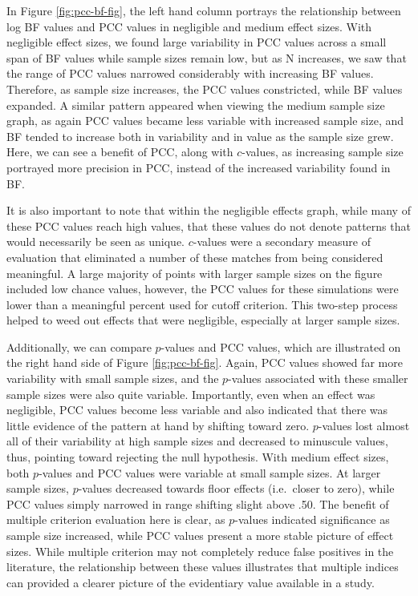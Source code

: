 \documentclass[english,man]{apa6}
\theoremstyle{definition}
\theoremstyle{definition}
\theoremstyle{definition}
\theoremstyle{remark}
\begin{document}
In Figure \ref{fig:pcc-bf-fig}, the left hand column portrays the
relationship between log BF values and PCC values in negligible and
medium effect sizes. With negligible effect sizes, we found large
variability in PCC values across a small span of BF values while sample
sizes remain low, but as N increases, we saw that the range of PCC
values narrowed considerably with increasing BF values. Therefore, as
sample size increases, the PCC values constricted, while BF values
expanded. A similar pattern appeared when viewing the medium sample size
graph, as again PCC values became less variable with increased sample
size, and BF tended to increase both in variability and in value as the
sample size grew. Here, we can see a benefit of PCC, along with
\(c\)-values, as increasing sample size portrayed more precision in PCC,
instead of the increased variability found in BF.

It is also important to note that within the negligible effects graph,
while many of these PCC values reach high values, that these values do
not denote patterns that would necessarily be seen as unique.
\(c\)-values were a secondary measure of evaluation that eliminated a
number of these matches from being considered meaningful. A large
majority of points with larger sample sizes on the figure included low
chance values, however, the PCC values for these simulations were lower
than a meaningful percent used for cutoff criterion. This two-step
process helped to weed out effects that were negligible, especially at
larger sample sizes.

Additionally, we can compare \(p\)-values and PCC values, which are
illustrated on the right hand side of Figure \ref{fig:pcc-bf-fig}.
Again, PCC values showed far more variability with small sample sizes,
and the \(p\)-values associated with these smaller sample sizes were
also quite variable. Importantly, even when an effect was negligible,
PCC values become less variable and also indicated that there was little
evidence of the pattern at hand by shifting toward zero. \(p\)-values
lost almost all of their variability at high sample sizes and decreased
to minuscule values, thus, pointing toward rejecting the null
hypothesis. With medium effect sizes, both \(p\)-values and PCC values
were variable at small sample sizes. At larger sample sizes,
\(p\)-values decreased towards floor effects (i.e.~closer to zero),
while PCC values simply narrowed in range shifting slight above .50. The
benefit of multiple criterion evaluation here is clear, as \(p\)-values
indicated significance as sample size increased, while PCC values
present a more stable picture of effect sizes. While multiple criterion
may not completely reduce false positives in the literature, the
relationship between these values illustrates that multiple indices can
provided a clearer picture of the evidentiary value available in a
study.
\end{document}
